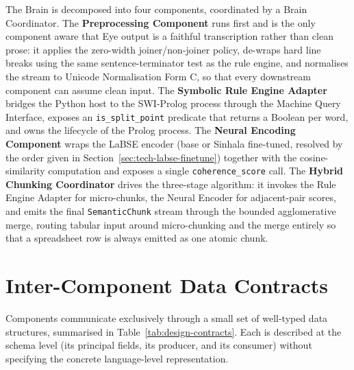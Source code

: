\documentclass[12pt,a4paper,oneside]{report}
\begin{document}
The Brain is decomposed into four components, coordinated by a Brain Coordinator. The \textbf{Preprocessing Component} runs first and is the only component aware that Eye output is a faithful transcription rather than clean prose: it applies the zero-width joiner/non-joiner policy, de-wraps hard line breaks using the same sentence-terminator test as the rule engine, and normalises the stream to Unicode Normalisation Form C, so that every downstream component can assume clean input. The \textbf{Symbolic Rule Engine Adapter} bridges the Python host to the SWI-Prolog process through the Machine Query Interface, exposes an \texttt{is\_split\_point} predicate that returns a Boolean per word, and owns the lifecycle of the Prolog process. The \textbf{Neural Encoding Component} wraps the LaBSE encoder (base or Sinhala fine-tuned, resolved by the order given in Section~\ref{sec:tech-labse-finetune}) together with the cosine-similarity computation and exposes a single \texttt{coherence\_score} call. The \textbf{Hybrid Chunking Coordinator} drives the three-stage algorithm: it invokes the Rule Engine Adapter for micro-chunks, the Neural Encoder for adjacent-pair scores, and emits the final \texttt{SemanticChunk} stream through the bounded agglomerative merge, routing tabular input around micro-chunking and the merge entirely so that a spreadsheet row is always emitted as one atomic chunk.

\section{Inter-Component Data Contracts}
\label{sec:design-contracts}
Components communicate exclusively through a small set of well-typed data structures, summarised in Table~\ref{tab:design-contracts}. Each is described at the schema level (its principal fields, its producer, and its consumer) without specifying the concrete language-level representation.
\end{document}
